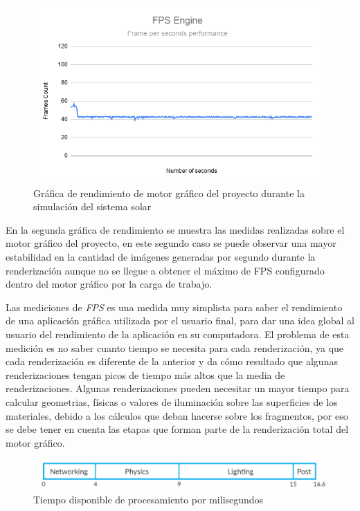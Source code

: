 \documentclass[a4paper]{book}
\begin{document}
\begin{figure}[H]
    \centering
    \includegraphics[width=11cm, keepaspectratio]{img/FPSEngine.png}
    \caption{Gráfica de rendimiento de motor gráfico del proyecto durante la simulación del sistema solar}
    \label{FPSEngine}
\end{figure}

En la segunda gráfica de rendimiento se muestra las medidas realizadas sobre el motor gráfico del proyecto, en este segundo
caso se puede observar una mayor estabilidad en la cantidad de imágenes generadas por segundo durante la renderización
aunque no se llegue a obtener el máximo de FPS configurado dentro del motor gráfico por la carga de trabajo. 

Las mediciones  de \textit{FPS} es una medida muy simplista para saber el rendimiento de una aplicación gráfica utilizada por 
el usuario final, para dar una idea global al usuario del rendimiento de la aplicación en su computadora. El problema de esta medición es no 
saber cuanto tiempo se necesita para cada renderización, ya que cada renderización es diferente de la anterior y da cómo resultado
que algunas renderizaciones tengan picos de tiempo más altos que la media de renderizaciones. Algunas renderizaciones pueden necesitar un
mayor tiempo para calcular geometrias, físicas o valores de iluminación sobre las superficies de los materiales, debido a los cálculos que deban
hacerse sobre los fragmentos, por eso se debe tener en cuenta las etapas que forman parte de la renderización total del motor gráfico. \cite{fps_02:_bad_performance}

\begin{figure}[H]
    \centering
    \includegraphics[width=12cm, keepaspectratio]{img/blog_fps-bars-first.png}
    \caption{Tiempo disponible de procesamiento por milisegundos}
    \label{FramesMeasurments}
\end{figure}
\end{document}
